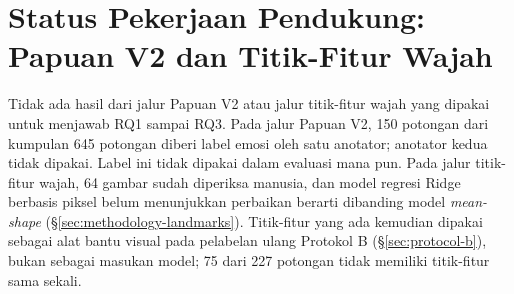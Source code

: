 \section{Status Pekerjaan Pendukung: Papuan V2 dan Titik-Fitur Wajah}
\label{sec:rq-papuanv2-status}

Tidak ada hasil dari jalur Papuan V2 atau jalur titik-fitur wajah yang dipakai untuk menjawab RQ1 sampai RQ3. Pada jalur Papuan V2, 150 potongan dari kumpulan 645 potongan diberi label emosi oleh satu anotator; anotator kedua tidak dipakai. Label ini tidak dipakai dalam evaluasi mana pun. Pada jalur titik-fitur wajah, 64 gambar sudah diperiksa manusia, dan model regresi Ridge berbasis piksel belum menunjukkan perbaikan berarti dibanding model \textit{mean-shape} (\S\ref{sec:methodology-landmarks}). Titik-fitur yang ada kemudian dipakai sebagai alat bantu visual pada pelabelan ulang Protokol B (\S\ref{sec:protocol-b}), bukan sebagai masukan model; 75 dari 227 potongan tidak memiliki titik-fitur sama sekali.
